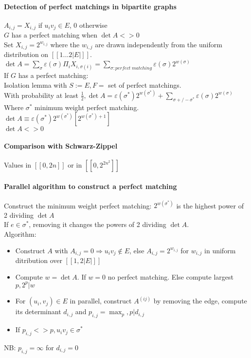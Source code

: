 \documentclass[12pt]{article}
\begin{document}
\paragraph{Detection of perfect matchings in bipartite graphs\\}
$A_{i,j} = X_{i,j}$ if $u_iv_j \in E$, $0$ otherwise\\
$G$ has a perfect matching when $\det A <> 0$\\
Set $X_{i,j} = 2^{w_{i,j}}$ where the $w_{i,j}$ are drawn independently from the uniform distribution on $[[1 ... 2|E|]]$.\\
$\det A = \sum_\sigma \varepsilon(\sigma) \Pi_i X_{i,\sigma(i)} = \sum_{\sigma: perfect \; matching} \varepsilon(\sigma) 2^{w(\sigma)}$\\
If $G$ has a perfect matching:\\
Isolation lemma with $S := E, F =$ set of perfect matchings.\\
With probability at least $\frac{1}{2}, \det A = \varepsilon(\sigma^*) 2^{w(\sigma^*)} + \sum_{\sigma +/- \sigma^*} \varepsilon(\sigma) 2^{w(\sigma)}$\\
Where $\sigma^*$ minimum weight perfect matching.\\
$\det A \equiv \varepsilon(\sigma^*) 2^{w(\sigma^*)} [2^{w(\sigma^*) +1}]$\\
$\det A <> 0$\\

\paragraph{Comparison with Schwarz-Zippel\\}
Values in $[[0 , 2n]]$ or in $[[0, 2^{2n^2}]]$\\

\paragraph{Parallel algorithm to construct a perfect matching\\}
Construct the minimum weight perfect matching: $2^{w(\sigma^*)}$ is the highest power of 2 dividing $\det A$\\
If $e \in \sigma^*$, removing it changes the powers of 2 dividing $\det A$.\\
Algorithm:
\begin{itemize}
\item Construct $A$ with $A_{i,j} = 0 \Rightarrow u_i v_j \notin E$, else $A_{i,j} = 2^{w_{i,j}}$ for $w_{i,j}$ in uniform ditribution over $[[1,2|E|]]$
\item Compute $w = \det A$. If $w=0$ no perfect matching. Else compute largest $p, 2^p | w$
\item For $(u_i, v_j) \in E$ in parallel, construct $A^{(ij)}$ by removing the edge, compute its determinant $d_{i,j}$ and $p_{i,j} = \max_p, p | d_{i,j}$
\item If $p_{i,j} <> p, u_i v_j \in \sigma^*$
\end{itemize}
NB: $p_{i,j} = \infty$ for $d_{i,j} = 0$\\
\end{document}
